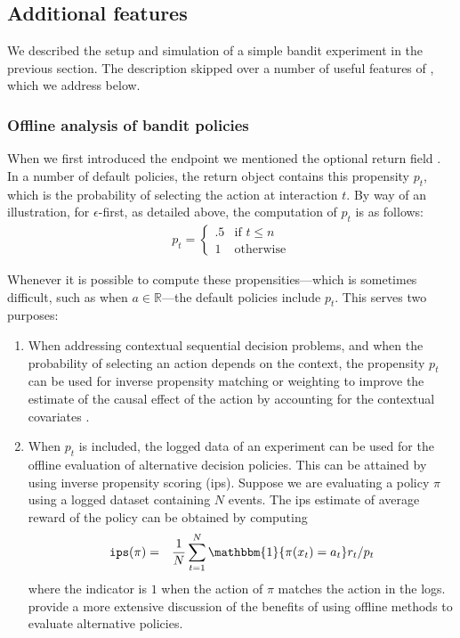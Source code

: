 \documentclass[nojss]{jss}
\begin{document}
\subsection{Additional features}

We described the setup and simulation of a simple bandit experiment in the previous section. The description skipped over a number of useful features of , which we address below.

\subsubsection{Offline analysis of bandit policies}
\label{sec:propensity}

When we first introduced the  endpoint we mentioned the optional return field . In a number of default policies, the return object contains this propensity $p_t$, which is the probability of selecting the action at interaction $t$. By way of an illustration, for $\epsilon$-first, as detailed above, the computation of $p_t$ is as follows:
\begin{eqnarray}
\label{eq:pol}
p_t = 
\begin{cases}
.5 & \text{if } t \leq n \\
1 & \text{otherwise}
\end{cases}
\label{simple:experiment}
\end{eqnarray}

Whenever it is possible to compute these propensities---which is sometimes difficult, such as when $a \in \mathbb{R}$---the default policies include $p_t$. This serves two purposes:
\begin{enumerate}
\item When addressing contextual sequential decision problems, and when the probability of selecting an action depends on the context, the propensity $p_t$ can be used for inverse propensity matching or weighting \citep{austin2011introduction} to improve the estimate of the causal effect of the action by accounting for the contextual covariates \citep[see, e.g.,][]{guido2015causal, pearl2009causality}.
\item When $p_t$ is included, the logged data of an experiment can be used for the offline evaluation of alternative decision policies. This can be attained by using inverse propensity scoring (ips). Suppose we are evaluating a policy $\pi$ using a logged dataset containing $N$ events. The ips estimate of average reward of the policy can be obtained by computing
\begin{eqnarray}
\texttt{ips}(\pi) & = & \frac{1}{N} \sum_{t=1}^{N} \mathbbm{1} \{ \pi(x_t) = a_t \} r_t / p_t
\end{eqnarray}
where the indicator is $1$ when the action of $\pi$ matches the action in the logs. \citet{agarwal2016making} provide a more extensive discussion of the benefits of using offline methods to evaluate alternative policies.
\end{enumerate}
\end{document}
